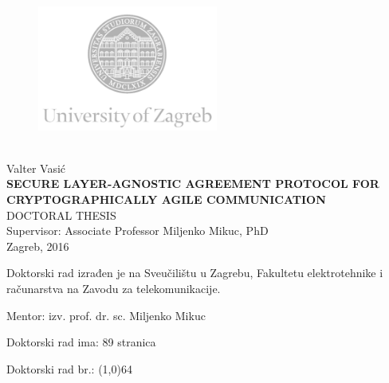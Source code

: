 \documentclass[12pt,oneside, a4paper]{book}
\begin{document}
\begin{titlepage}
  \fontsize{16pt}{20pt}\selectfont
  \selectfont
  \setlength{\intextsep}{0pt plus 0pt minus 0pt}

  \begin{center}
    \begin{figure}[ht!]
      \begin{center}
        \includegraphics[height=4.1184cm, width=5.94cm]{logo_unizg_eng}
      \end{center}
    \end{figure}		
    \vspace{0cm}
    {} \\
    \vspace{3cm}
    Valter Vasić \\
    \vspace{2cm}
    {\fontsize{22pt}{22pt}\selectfont\textbf{SECURE LAYER-AGNOSTIC AGREEMENT
	    PROTOCOL FOR CRYPTOGRAPHICALLY AGILE COMMUNICATION}} \\
    \vspace{2cm}   
    DOCTORAL THESIS \\  
    \vspace{5cm}   %
    Supervisor: Associate Professor Miljenko Mikuc, PhD \\
    \vfill{Zagreb, 2016}
  \end{center}
  \restoregeometry
\end{titlepage}

\begin{titlepage}
  \begin{minipage}{\dimexpr\textwidth-1cm}
    \vspace{3cm}
    Doktorski rad izrađen je na Sveučilištu u Zagrebu,
    Fakultetu elektrotehnike i računarstva na Zavodu za telekomunikacije.

    \vspace{1cm}
    Mentor: izv. prof. dr. sc. Miljenko Mikuc

    \vspace{1cm}
    Doktorski rad ima: 89 stranica

    \vspace{1cm}
    Doktorski rad br.: \line(1,0){64}
  \end{minipage}
\end{titlepage}
\end{document}
